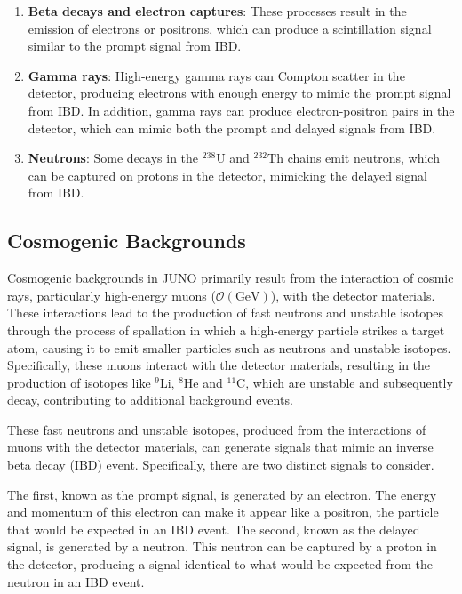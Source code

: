 \begin{enumerate}
	\item \textbf{Beta decays and electron captures}: These processes result in the emission of electrons or positrons, which can produce a scintillation signal similar to the prompt signal from IBD.

	\item \textbf{Gamma rays}: High-energy gamma rays can Compton scatter in the detector, producing electrons with enough energy to mimic the prompt signal from IBD. In addition, gamma rays can produce electron-positron pairs in the detector, which can mimic both the prompt and delayed signals from IBD.
	
	\item \textbf{Neutrons}: Some decays in the $^{238}\mathrm{U}$ and $^{232}\mathrm{Th}$ chains emit neutrons, which can be captured on protons in the detector, mimicking the delayed signal from IBD.

\end{enumerate}

\subsection*{Cosmogenic Backgrounds}

Cosmogenic backgrounds in JUNO primarily result from the interaction of cosmic rays, particularly high-energy muons ($\mathcal{O}(\text{GeV})$), with the detector materials. These interactions lead to the production of fast neutrons and unstable isotopes through the process of spallation in which a high-energy particle strikes a target atom, causing it to emit smaller particles such as neutrons and unstable isotopes. Specifically, these muons interact with the detector materials, resulting in the production of isotopes like  $^{9}\mathrm{Li}$, $^{8}\mathrm{He}$ and $^{11}\mathrm{C}$, which are unstable and subsequently decay, contributing to additional background events.

These fast neutrons and unstable isotopes, produced from the interactions of muons with the detector materials, can generate signals that mimic an inverse beta decay (IBD) event. Specifically, there are two distinct signals to consider.

The first, known as the prompt signal, is generated by an electron. The energy and momentum of this electron can make it appear like a positron, the particle that would be expected in an IBD event. The second, known as the delayed signal, is generated by a neutron. This neutron can be captured by a proton in the detector, producing a signal identical to what would be expected from the neutron in an IBD event.


